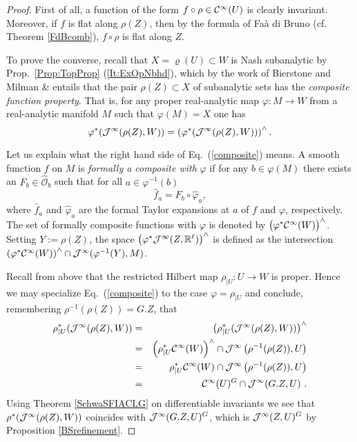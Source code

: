 \begin{proof} First of all, a function of the form $f\circ \rho\in \mathcal{C}^\infty(U)$ is clearly 
invariant. Moreover, if $f$ is flat along $\rho(Z)$, then by the formula of Fa{\`a} di Bruno 
(cf. Theorem \ref{FdBcomb}), $f\circ \rho$ is flat along $Z$.

To prove the converse, recall that $X = \varrho (U)\subset W$ is Nash subanalytic by 
Prop.~\ref{Prop:TopProp} (\ref{It:ExOpNbhd}), which 
by the work of Bierstone and Milman  \cite[Thm.~3.2]{BieMilCDF} \& \cite[Thm.~1.13]{BieMilGDPSS} entails that 
the pair $\rho(Z)\subset X$ of subanalytic sets has the 
\emph{composite function property}.  That is, for any proper real-analytic map 
$\varphi:M\to  W$ from a real-analytic manifold $M$ such that 
$\varphi(M)=X$ one has
\begin{equation}\label{composite}
  \varphi^*(\mathcal{J}^\infty(\rho(Z), W))=
  \left( \varphi^*(\mathcal{J}^\infty(\rho (Z), W))\right)^{\wedge}.
\end{equation}

Let us explain what the right hand side of Eq.~(\ref{composite}) means. 
A smooth function $f$ on $M$ is \emph{formally a composite with} 
$\varphi$ if for any $b\in \varphi(M)$ there exists an  
$F_b\in \widehat{\mathcal O}_b$ 
such that for all $a\in \varphi^{-1}(b)$
\[
   \widehat{f}_a=F_b\circ \widehat{\varphi}_a,
\]
where $\widehat{f}_a$ and $\widehat{\varphi}_a$ are the formal Taylor expansions at 
$a$ of $f$ and $\varphi$, respectively. The set of formally composite functions 
with $\varphi$ is denoted by $\big(\varphi^*\mathcal{C}^\infty(W)\big)^\wedge$. 
Setting $Y:=\rho(Z)$, the space $\big(\varphi^*\mathcal{J}^\infty(Z,\mathbb R^\ell)\big)^\wedge$ is 
defined as the intersection 
$\left(\varphi^*\mathcal C^\infty(W)\right)^\wedge 
 \cap\mathcal{J}^\infty(\varphi^{-1}(Y),M)$.

Recall from above that the restricted Hilbert map $\rho_{|U} : U \to W$ is proper. Hence we may 
specialize Eq.~(\ref{composite}) to the case $\varphi=\rho_{|U}$ and conclude, remembering $\rho^{-1}(\rho(Z))=G.Z$, that
\begin{eqnarray*} \label{lhs}
  \rho_{|U}^*(\mathcal{J}^\infty(\rho (Z), W ))&=&
  \big( \rho_{|U}^*(\mathcal{J}^\infty(\rho(Z),W ))\big)^{\wedge}\\
  &=&\left(\rho_{|U}^*\mathcal{C}^\infty( W )\right)^{\wedge}\cap 
  \mathcal{J}^\infty\left(\rho^{-1}(\rho(Z)),U\right)\\
   &=&\ \rho_{|U}^*\mathcal{C}^\infty( W )\cap 
  \mathcal{J}^\infty\left(\rho^{-1}(\rho(Z)),U\right)\\
   &=&\ \mathcal{C}^\infty(U)^G \cap \mathcal{J}^\infty(G.Z,U) \ .
\end{eqnarray*}
 Using Theorem \ref{SchwaSFIACLG} on differentiable invariants we see 
that $\rho^*(\mathcal{J}^\infty(\rho (Z), W))$ coincides with $\mathcal{J}^\infty(G.Z,U)^G$, which is  
$\mathcal{J}^\infty(Z,U)^G$ by Proposition \ref{BSrefinement}.
\end{proof}

